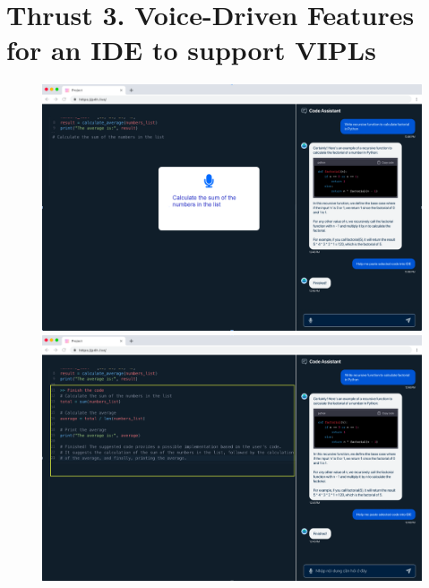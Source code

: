 \section{Thrust 3. Voice-Driven Features for an IDE to support VIPLs}
\label{sec:thrust3}


\begin{figure}[t]
\centering
\begin{minipage}{.48\textwidth}
\centering
\includegraphics[width=.98\textwidth]{p4h-3}
\end{minipage}
\begin{minipage}{.48\textwidth}
\centering
\includegraphics[width=.98\textwidth]{p4h-4}

\end{minipage}
\end{figure}
